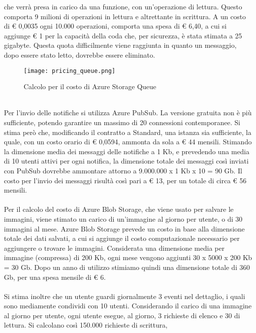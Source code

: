 che verrà presa in carico da una funzione, con un'operazione di lettura.
Questo comporta 9 milioni di operazioni in lettura e altrettante in scrittura.
A un costo di € 0,0035 ogni 10.000 operazioni, comporta una spesa di € 6,40, 
a cui si aggiunge € 1 per la capacità della coda che, per sicurezza, è stata stimata a 25 gigabyte.
Questa quota difficilmente viene raggiunta in quanto un messaggio, 
dopo essere stato letto, dovrebbe essere eliminato.\\
\begin{figure}[htbp]
    \begin{center}
        \texttt{[image: pricing\_queue.png]}
        \caption{Calcolo per il costo di Azure Storage Queue}
    \end{center}
\end{figure}
\\
Per l'invio delle notifiche si utilizza Azure PubSub.
La versione gratuita non è più sufficiente, 
potendo garantire un massimo di 20 connessioni contemporanee.
Si stima però che, modificando il contratto a Standard, una istanza sia sufficiente,
la quale, con un costo orario di € 0,0594, ammonta da sola a € 44 mensili.
Stimando la dimensione media dei messaggi delle notifiche a 1 Kb,
e prevedendo una media di 10 utenti attivi per ogni notifica, 
la dimensione totale dei messaggi così inviati con PubSub 
dovrebbe ammontare attorno a 9.000.000 x 1 Kb x 10 = 90 Gb.
Il costo per l'invio dei messaggi risultà così pari a € 13, per un totale di circa € 56 mensili.\\
\\
Per il calcolo del costo di Azure Blob Storage, 
che viene usato per salvare le immagini,
viene stimato un carico di un'immagine al giorno per utente,
o di 30 immagini al mese.
Azure Blob Storage prevede un costo in base alla dimensione totale dei dati salvati,
a cui si aggiunge il costo computazionale necessario per aggiungere o trovare le immagini.
Considerata una dimensione media per immagine (compressa) di 200 Kb,
ogni mese vengono aggiunti 30 x 5000 x 200 Kb = 30 Gb.
Dopo un anno di utilizzo stimiamo quindi una dimensione totale di 360 Gb, 
per una spesa mensile di € 6.\\
\\
Si stima inoltre che un utente guardi giornalmente 3 eventi nel dettaglio, 
i quali sono mediamente condividi con 10 utenti.
Considerando il carico di una immagine al giorno per utente,
ogni utente esegue, al giorno, 3 richieste di elenco e 30 di lettura.
Si calcolano così 150.000 richieste di scrittura,
